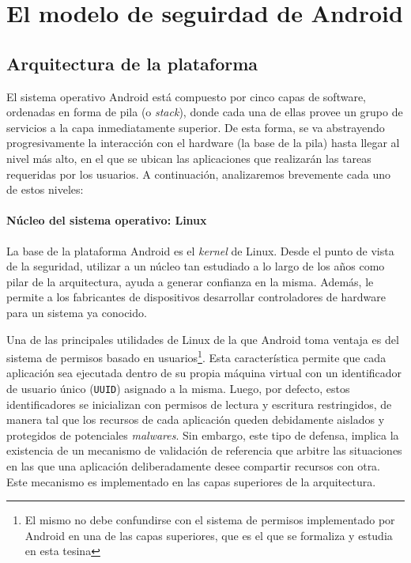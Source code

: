 \chapter{El modelo de seguirdad de Android}
\label{chapter:background}

\section{Arquitectura de la plataforma}
\label{section:architecture}

El sistema operativo Android está compuesto por cinco capas de software, ordenadas en forma de pila
(o \textit{stack}), donde cada una de ellas provee un grupo de servicios a la capa inmediatamente
superior. De esta forma, se va abstrayendo progresivamente la interacción con el hardware (la base
de la pila) hasta llegar al nivel más alto, en el que se ubican las aplicaciones que realizarán las
tareas requeridas por los usuarios. A continuación, analizaremos brevemente cada uno de estos
niveles:

\subsubsection*{Núcleo del sistema operativo: Linux}
\label{section:architecture:kernel}
La base de la plataforma Android es el \textit{kernel} de Linux. Desde el punto de vista de la
seguridad, utilizar a un núcleo tan estudiado a lo largo de los años como pilar de la arquitectura,
ayuda a generar confianza en la misma. Además, le permite a los fabricantes de dispositivos
desarrollar controladores de hardware para un sistema ya conocido.

Una de las principales utilidades de Linux de la que Android toma ventaja es del sistema de permisos
basado en usuarios\footnote{El mismo no debe confundirse con el sistema de permisos implementado por
    Android en una de las capas superiores, que es el que se formaliza y estudia en esta tesina}. Esta
característica permite que cada aplicación sea ejecutada dentro de su propia máquina virtual con un
identificador de usuario único (\texttt{UUID}) asignado a la misma. Luego, por defecto, estos
identificadores se inicializan con permisos de lectura y escritura restringidos, de manera tal que
los recursos de cada aplicación queden debidamente aislados y protegidos de potenciales
\textit{malwares}. Sin embargo, este tipo de defensa, implica la existencia de un mecanismo de
validación de referencia que arbitre las situaciones en las que una aplicación deliberadamente desee
compartir recursos con otra. Este mecanismo es implementado en las capas superiores de la
arquitectura.

